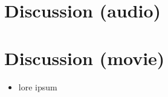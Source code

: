 \documentclass[english]{article}
\begin{document}
\section{Discussion (audio)}

\section{Discussion (movie)}
\begin{itemize}
\item lore ipsum
\end{itemize}
\end{document}
